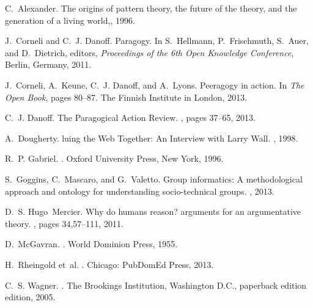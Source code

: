 \documentclass{acm_proc_article-sp}
\begin{document}

\begin{thebibliography}{10}

C.~Alexander.
\newblock The origins of pattern theory, the future of the theory, and the
  generation of a living world,, 1996.

J.~Corneli and C.~J. Danoff.
\newblock Paragogy.
\newblock In S.~Hellmann, P.~Frischmuth, S.~Auer, and D.~Dietrich, editors,
  {\em Proceedings of the 6th Open Knowledge Conference}, Berlin, Germany,
  2011.

J.~Corneli, A.~Keune, C.~J. Danoff, and A.~Lyons.
\newblock Peeragogy in action.
\newblock In {\em The Open Book}, pages 80--87. The Finnish Institute in
  London, 2013.

C.~J. Danoff.
\newblock The {P}aragogical {A}ction {R}eview.
, pages
  37--65, 2013.

A.~Dougherty.
luing the {W}eb {T}ogether: {A}n {I}nterview with {L}arry {W}all.
, 1998.

R.~P. Gabriel.
.
\newblock Oxford University Press, New York, 1996.

S.~Goggins, C.~Mascaro, and G.~Valetto.
\newblock Group informatics: A methodological approach and ontology for
  understanding socio-technical groups.
, 2013.

D.~S. Hugo~Mercier.
\newblock Why do humans reason? arguments for an argumentative theory.
, pages 34,57--111, 2011.

D.~McGavran.
.
\newblock World Dominion Press, 1955.

H.~Rheingold et~al.
.
\newblock Chicago: PubDomEd Press, 2013.

C.~S. Wagner.
.
\newblock The Brookings Institution, Washington D.C., paperback edition
  edition, 2005.

\end{thebibliography}

\balancecolumns
\end{document}
